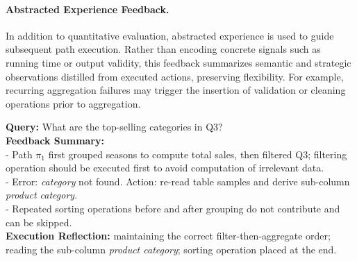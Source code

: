 \paragraph{Abstracted Experience Feedback.} In addition to quantitative evaluation, abstracted experience is used to guide subsequent path execution. Rather than encoding concrete signals such as running time or output validity, this feedback summarizes semantic and strategic observations distilled from executed actions, preserving flexibility. For example, recurring aggregation failures may trigger the insertion of validation or cleaning operations prior to aggregation. 
\begin{tcolorbox}[
    colback = blue!5!white, colframe = blue!75!black, arc = 3pt, boxrule = 1pt
]
{  \footnotesize
\textbf{Query: }What are the top-selling categories in Q3? \\ 
\textbf{Feedback Summary: } \\
- Path \(\pi_1\) first grouped seasons to compute total sales, then filtered Q3; filtering operation should be executed first to avoid computation of irrelevant data. \\  
- Error: \textit{category} not found. Action: re-read table samples and derive sub-column \textit{product category}.\\ 
- Repeated sorting operations before and after grouping do not contribute and can be skipped.  \\
\textbf{Execution Reflection:} maintaining the correct filter-then-aggregate order; reading the sub-column \textit{product category}; sorting operation placed at the end.
}

\end{tcolorbox}

